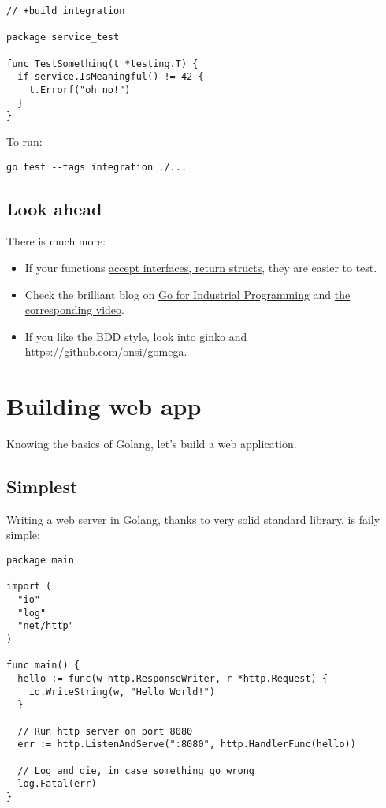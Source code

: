 \documentclass[11pt, letterpaper]{article}
\begin{document}
\begin{verbatim}
// +build integration

package service_test

func TestSomething(t *testing.T) {
  if service.IsMeaningful() != 42 {
    t.Errorf("oh no!")
  }
}
\end{verbatim}

To run:

\begin{verbatim}
go test --tags integration ./...
\end{verbatim}

\subsection{Look ahead}
There is much more:

\begin{itemize}
\item If your functions \href{https://blog.chewxy.com/2018/03/18/golang-interfaces/}{accept interfaces, return structs}, they are easier to test.
\item Check the brilliant blog on \href{https://peter.bourgon.org/go-for-industrial-programming/}{Go for Industrial Programming} and \href{https://www.youtube.com/watch?v=PTE4VJIdHPg}{the corresponding video}.
\item If you like the BDD style, look into \href{https://github.com/onsi/ginkgo}{ginko} and \href{gomega}{https://github.com/onsi/gomega}.
\end{itemize}

\pagebreak
\section{Building web app}

Knowing the basics of Golang, let's build a web application.

\subsection{Simplest}

Writing a web server in Golang, thanks to very solid standard library, is faily simple:

\begin{verbatim}
package main

import (
  "io"
  "log"
  "net/http"
)

func main() {
  hello := func(w http.ResponseWriter, r *http.Request) {
    io.WriteString(w, "Hello World!")
  }

  // Run http server on port 8080
  err := http.ListenAndServe(":8080", http.HandlerFunc(hello))

  // Log and die, in case something go wrong
  log.Fatal(err)
}
\end{verbatim}
\end{document}
